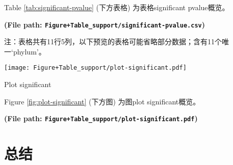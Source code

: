\documentclass[
]{article}
\begin{document}
Table \ref{tab:significant-pvalue} (下方表格) 为表格significant pvalue概览。

\textbf{(File path: \texttt{Figure+Table\_support/significant-pvalue.csv})}

\begin{center}\begin{tcolorbox}[colback=gray!10, colframe=gray!50, width=0.9\linewidth, arc=1mm, boxrule=0.5pt]注：表格共有11行5列，以下预览的表格可能省略部分数据；含有11个唯一`phylum'。
\end{tcolorbox}
\end{center}

\begin{center}\vspace{1.5cm}\end{center}

\begin{center}\vspace{1.5cm}\end{center}
\def\@captype{figure}
\begin{center}
\texttt{[image: Figure+Table\_support/plot-significant.pdf]}
\caption{Plot significant}\label{fig:plot-significant}
\end{center}

Figure \ref{fig:plot-significant} (下方图) 为图plot significant概览。

\textbf{(File path: \texttt{Figure+Table\_support/plot-significant.pdf})}

\begin{center}\vspace{1.5cm}\end{center}

\hypertarget{conclusion}{%
\section{总结}\label{conclusion}}
\end{document}
